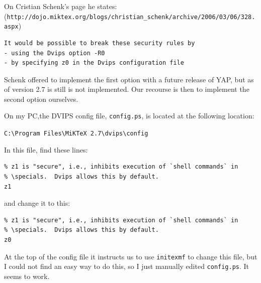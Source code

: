 On Cristian Schenk's page he states:\\
(\verb+http://dojo.miktex.org/blogs/christian_schenk/archive/2006/03/06/328.aspx+)

{\small
\begin{verbatim}
It would be possible to break these security rules by
- using the Dvips option -R0
- by specifying z0 in the Dvips configuration file
\end{verbatim}
}

Schenk offered to implement the first option with a future release of YAP, but as of version 2.7 is still is not implemented.  Our recourse is then to implement the second option ourselves.

On my PC,the DVIPS config file, \verb"config.ps", is located at the following location:

\verb+C:\Program Files\MiKTeX 2.7\dvips\config+

In this file, find these lines:

\begin{verbatim}
% z1 is "secure", i.e., inhibits execution of `shell commands` in
% \specials.  Dvips allows this by default.
z1
\end{verbatim}

and change it to this:

\begin{verbatim}
% z1 is "secure", i.e., inhibits execution of `shell commands` in
% \specials.  Dvips allows this by default.
z0
\end{verbatim}

At the top of the config file it instructs us to use \verb"initexmf" to change this file, but I could not find an easy way to do this, so I just manually edited \verb"config.ps".  It seems to work.



